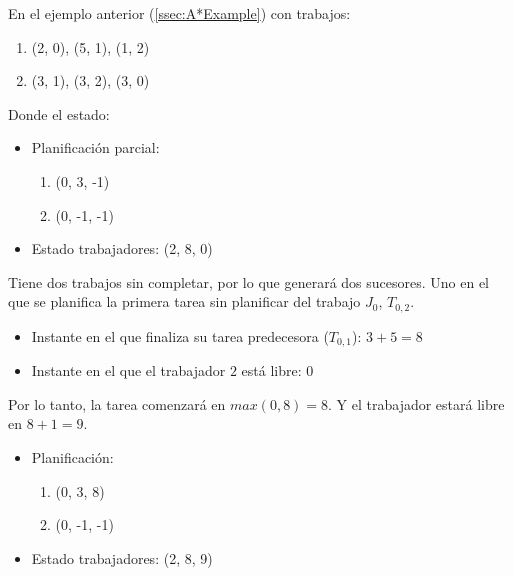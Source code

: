 \begin{examplebox}
    En el ejemplo anterior (\ref{ssec:A*Example}) con trabajos:
    \begin{enumerate}[start=0, itemsep=0.25px]
        \item (2, 0), (5, 1), (1, 2)
        \item (3, 1), (3, 2), (3, 0)
    \end{enumerate}
    Donde el estado:
    \begin{itemize}[itemsep=0.25px]
        \item Planificación parcial:
        \begin{enumerate}[start=0, itemsep=0.25px]
            \item (0, 3, -1)
            \item (0, -1, -1)
        \end{enumerate}
        \item Estado trabajadores: (2, 8, 0)
    \end{itemize}
    Tiene dos trabajos sin completar, por lo que generará dos sucesores.
    Uno en el que se planifica la primera tarea sin planificar del trabajo $J_0$, $T_{0,2}$.
    \begin{itemize}[itemsep=0.25px]
        \item Instante en el que finaliza su tarea predecesora ($T_{0,1}$): $3 + 5 = 8$
        \item Instante en el que el trabajador $2$ está libre: $0$
    \end{itemize}
    Por lo tanto, la tarea comenzará en $max(0, 8) = 8$.
    Y el trabajador estará libre en $8 + 1 = 9$.
    \begin{itemize}[itemsep=0.25px]
        \item Planificación:
        \begin{enumerate}[start=0, itemsep=0.25px]
            \item (0, 3, 8)
            \item (0, -1, -1)
        \end{enumerate}
        \item Estado trabajadores: (2, 8, 9)
    \end{itemize}


\end{examplebox}
